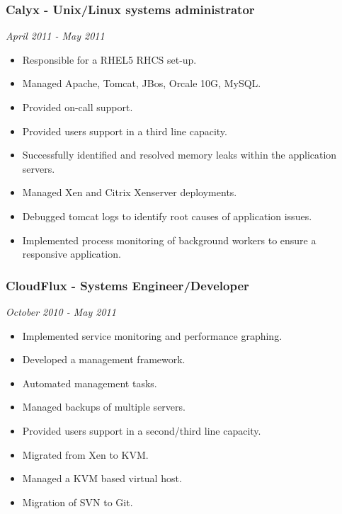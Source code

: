 \subsubsection{Calyx - Unix/Linux systems
administrator}\label{calyx---unixlinux-systems-administrator}

\emph{April 2011 - May 2011}

\begin{itemize}
\itemsep1pt\parskip0pt
\item
  Responsible for a RHEL5 RHCS set-up.
\item
  Managed Apache, Tomcat, JBos, Orcale 10G, MySQL.
\item
  Provided on-call support.
\item
  Provided users support in a third line capacity.
\item
  Successfully identified and resolved memory leaks within the
  application servers.
\item
  Managed Xen and Citrix Xenserver deployments.
\item
  Debugged tomcat logs to identify root causes of application issues.
\item
  Implemented process monitoring of background workers to ensure a
  responsive application.
\end{itemize}

\subsubsection{CloudFlux - Systems
Engineer/Developer}\label{cloudflux---systems-engineerdeveloper}

\emph{October 2010 - May 2011}

\begin{itemize}
\itemsep1pt\parskip0pt
\item
  Implemented service monitoring and performance graphing.
\item
  Developed a management framework.
\item
  Automated management tasks.
\item
  Managed backups of multiple servers.
\item
  Provided users support in a second/third line capacity.
\item
  Migrated from Xen to KVM.
\item
  Managed a KVM based virtual host.
\item
  Migration of SVN to Git.
\end{itemize}

